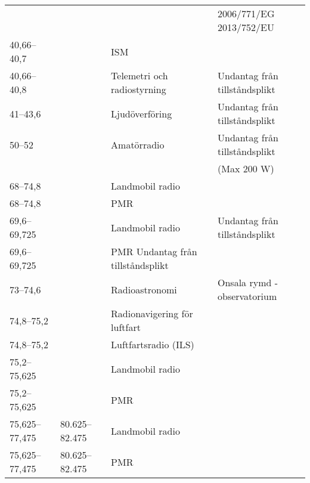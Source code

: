 \begin{landscape}
\begin{longtable}{llll}
	                                       &                    &                                       & 2006/771/EG 2013/752/EU        \\
	40,66--40,7                            &                    & ISM                                   &  \\
	40,66--40,8                            &                    & Telemetri och radiostyrning           & Undantag från tillståndsplikt  \\
	41--43,6                               &                    & Ljudöverföring                        & Undantag från tillståndsplikt  \\
	50--52                                 &                    & Amatörradio                           & Undantag från tillståndsplikt  \\
	                                       &                    &                                       & (Max 200 W)                    \\
	68--74,8                               &                    & Landmobil radio                       &  \\
	68--74,8                               &                    & PMR                                   &  \\
	69,6--69,725                           &                    & Landmobil radio                       & Undantag från tillståndsplikt  \\
	69,6--69,725                           &                    & PMR	Undantag från tillståndsplikt     &  \\
	73--74,6                               &                    & Radioastronomi                        & Onsala rymd - observatorium    \\
	74,8--75,2                             &                    & Radionavigering för luftfart          &  \\
	74,8--75,2                             &                    & Luftfartsradio (ILS)                  &  \\
	75,2--75,625                           &                    & Landmobil radio                       &  \\
	75,2--75,625                           &                    & PMR                                   &  \\
	75,625--77,475                         & 80.625--82.475     & Landmobil radio                       &  \\
	75,625--77,475                         & 80.625--82.475     & PMR                                   &  \\

\end{longtable}
\end{landscape}

